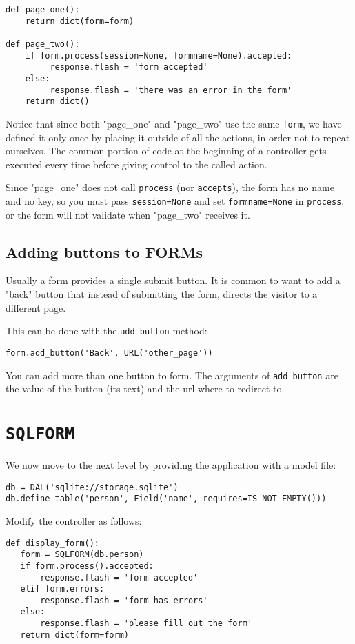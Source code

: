 \documentclass[justified,sixbynine,notoc]{tufte-book}
\def\ft{\small\tt}
\def\inxx#1{\index{#1}}
\begin{document}
\begin{fullwidth}
\begin{lstlisting}
def page_one():
    return dict(form=form)

def page_two():
    if form.process(session=None, formname=None).accepted:
         response.flash = 'form accepted'
    else:
         response.flash = 'there was an error in the form'
    return dict()
\end{lstlisting}

Notice that since both "page\_one" and "page\_two" use the same {\ft form}, we have defined it only once by placing it outside of all the actions, in order not to repeat ourselves. The common portion of code at the beginning of a controller gets executed every time before giving control to the called action.

Since "page\_one" does not call {\ft process} (nor {\ft accepts}), the form has no name and no key, so you must pass  {\ft session=None} and set {\ft formname=None} in {\ft process}, or the form will not validate when "page\_two" receives it.

\goodbreak\subsection{Adding buttons to FORMs}

Usually a form provides a single submit button. It is common to want to add a "back" button that instead of submitting the form, directs the visitor to a different page.

\inxx{add\_button}

This can be done with the {\ft add\_button} method:

\begin{lstlisting}
form.add_button('Back', URL('other_page'))
\end{lstlisting}

You can add more than one button to form. The arguments of {\ft add\_button} are the value of the button (its text) and the url where to redirect to.

\goodbreak\section{{\ft SQLFORM}}

We now move to the next level by providing the application with a model file:
\begin{lstlisting}
db = DAL('sqlite://storage.sqlite')
db.define_table('person', Field('name', requires=IS_NOT_EMPTY()))
\end{lstlisting}

Modify the controller as follows:
\begin{lstlisting}
def display_form():
   form = SQLFORM(db.person)
   if form.process().accepted:
       response.flash = 'form accepted'
   elif form.errors:
       response.flash = 'form has errors'
   else:
       response.flash = 'please fill out the form'
   return dict(form=form)
\end{lstlisting}


\end{fullwidth}
\end{document}
